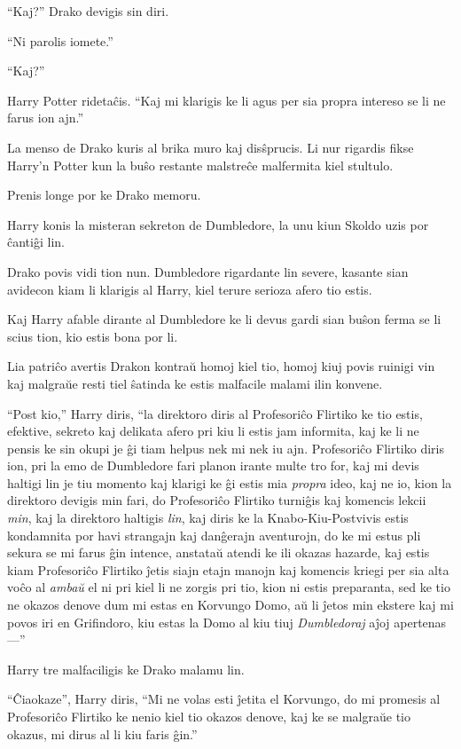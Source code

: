 ``Kaj?'' Drako devigis sin diri.

``Ni parolis iomete.''

``Kaj?''

Harry Potter ridetaĉis. ``Kaj mi klarigis ke li agus per sia propra
intereso se li ne farus ion ajn.''

La menso de Drako kuris al brika muro kaj disŝprucis. Li nur rigardis
fikse Harry'n Potter kun la buŝo restante malstreĉe malfermita kiel
stultulo.

Prenis longe por ke Drako memoru.

Harry konis la misteran sekreton de Dumbledore, la unu kiun Skoldo uzis por ĉantiĝi lin.

Drako povis vidi tion nun. Dumbledore rigardante lin severe, kasante
sian avidecon kiam li klarigis al Harry, kiel terure serioza afero tio
estis.

Kaj Harry afable dirante al Dumbledore ke li devus gardi sian buŝon
ferma se li scius tion, kio estis bona por li.

Lia patriĉo avertis Drakon kontraŭ homoj kiel tio, homoj kiuj povis
ruinigi vin kaj malgraŭe resti tiel ŝatinda ke estis malfacile malami
ilin konvene.

``Post kio,'' Harry diris, ``la direktoro diris al Profesoriĉo
Flirtiko ke tio estis, efektive, sekreto kaj delikata afero pri kiu li
estis jam informita, kaj ke li ne pensis ke sin okupi je ĝi tiam
helpus nek mi nek iu ajn. Profesoriĉo Flirtiko diris ion, pri la emo
de Dumbledore fari planon irante multe tro for, kaj mi devis haltigi
lin je tiu momento kaj klarigi ke ĝi estis mia \emph{propra} ideo, kaj
ne io, kion la direktoro devigis min fari, do Profesoriĉo Flirtiko
turniĝis kaj komencis lekcii \emph{min}, kaj la direktoro haltigis
\emph{lin}, kaj diris ke la Knabo-Kiu-Postvivis estis kondamnita por
havi strangajn kaj danĝerajn aventurojn, do ke mi estus pli sekura se
mi farus ĝin intence, anstataŭ atendi ke ili okazas hazarde, kaj estis
kiam Profesoriĉo Flirtiko ĵetis siajn etajn manojn kaj komencis kriegi
per sia alta voĉo al \emph{ambaŭ} el ni pri kiel li ne zorgis pri tio,
kion ni estis preparanta, sed ke tio ne okazos denove dum mi estas en
Korvungo Domo, aŭ li ĵetos min ekstere kaj mi povos iri en Grifindoro,
kiu estas la Domo al kiu tiuj \emph{Dumbledoraj} aĵoj apertenas—''

Harry tre malfaciligis ke Drako malamu lin.

``Ĉiaokaze'', Harry diris, ``Mi ne volas esti ĵetita el Korvungo, do
mi promesis al Profesoriĉo Flirtiko ke nenio kiel tio okazos denove,
kaj ke se malgraŭe tio okazus, mi dirus al li kiu faris ĝin.''

